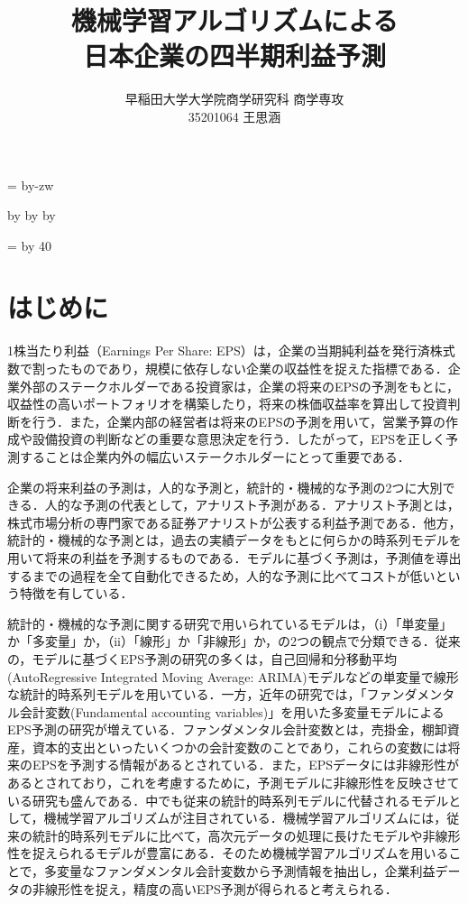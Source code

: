 \documentclass[a4paper，11pt]{jsarticle}
\title{機械学習アルゴリズムによる\\
  日本企業の四半期利益予測}
\author{早稲田大学大学院商学研究科 商学専攻\\
  35201064 王思涵}
\makeatletter
\def\mojiparline#1{
    \newcounter{mpl}
    \setcounter{mpl}{#1}
    \@tempdima=\linewidth
    \advance\@tempdima by-\value{mpl}zw
    \addtocounter{mpl}{-1}
    \divide\@tempdima by \value{mpl}
    \advance\kanjiskip by\@tempdima
    \advance\parindent by\@tempdima
}
\def\linesparpage#1{
    \baselineskip=\textheight
    \divide\baselineskip by #1
}
\makeatother
\begin{document}
\mojiparline{35}
\linesparpage{40}

\maketitle
\tableofcontents

\part{はじめに}

1株当たり利益（Earnings Per Share: EPS）は，企業の当期純利益を発行済株式数で割ったものであり，規模に依存しない企業の収益性を捉えた指標である．企業外部のステークホルダーである投資家は，企業の将来のEPSの予測をもとに，収益性の高いポートフォリオを構築したり，将来の株価収益率を算出して投資判断を行う．また，企業内部の経営者は将来のEPSの予測を用いて，営業予算の作成や設備投資の判断などの重要な意思決定を行う．したがって，EPSを正しく予測することは企業内外の幅広いステークホルダーにとって重要である．

企業の将来利益の予測は，人的な予測と，統計的・機械的な予測の2つに大別できる．人的な予測の代表として，アナリスト予測がある．アナリスト予測とは，株式市場分析の専門家である証券アナリストが公表する利益予測である．他方，統計的・機械的な予測とは，過去の実績データをもとに何らかの時系列モデルを用いて将来の利益を予測するものである．モデルに基づく予測は，予測値を導出するまでの過程を全て自動化できるため，人的な予測に比べてコストが低いという特徴を有している\citep{sakurai1990}．

統計的・機械的な予測に関する研究で用いられているモデルは，（i）「単変量」か「多変量」か，（ii）「線形」か「非線形」か，の2つの観点で分類できる\citep{zhang2004neural}．従来の，モデルに基づくEPS予測の研究の多くは，自己回帰和分移動平均(AutoRegressive Integrated Moving Average: ARIMA)モデル\citep{box2015time}などの単変量で線形な統計的時系列モデルを用いている．一方，近年の研究では，「ファンダメンタル会計変数(Fundamental accounting variables)」を用いた多変量モデルによるEPS予測の研究が増えている．ファンダメンタル会計変数とは，売掛金，棚卸資産，資本的支出といったいくつかの会計変数のことであり，これらの変数には将来のEPSを予測する情報があるとされている\citep*{lev1993fundamental, abarbanell1997fundamental}．また，EPSデータには非線形性があるとされており\citep*{hopwood1986univariate}，これを考慮するために，予測モデルに非線形性を反映させている研究も盛んである．中でも従来の統計的時系列モデルに代替されるモデルとして，機械学習アルゴリズムが注目されている．機械学習アルゴリズムには，従来の統計的時系列モデルに比べて，高次元データの処理に長けたモデルや非線形性を捉えられるモデルが豊富にある\citep*{cao2020fundamental}．そのため機械学習アルゴリズムを用いることで，多変量なファンダメンタル会計変数から予測情報を抽出し，企業利益データの非線形性を捉え，精度の高いEPS予測が得られると考えられる．
\end{document}
